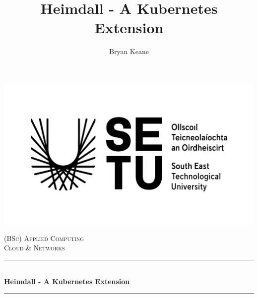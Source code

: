 \documentclass{article}
\title{Heimdall - A Kubernetes Extension}
\author{Bryan Keane}
\begin{document}
\begin{titlepage}

    \newcommand{\HRule}{\rule{\linewidth}{0.5mm}} 
    \center
    
    
    \begin{center}
        \includegraphics{setu_logo.png}
    \end{center}
     
    
     
    \textsc{\LARGE (BSc) Applied Computing}\\[0.25cm]
    \textsc{\Large Cloud \& Networks}\\[0.25cm] 
    
    
    
    \HRule \\[0.75cm]
    { \huge \bfseries Heimdall - A Kubernetes Extension}\\[0.3cm] %
    \HRule \\[1.0cm]
     
    

\end{titlepage}
\end{document}
